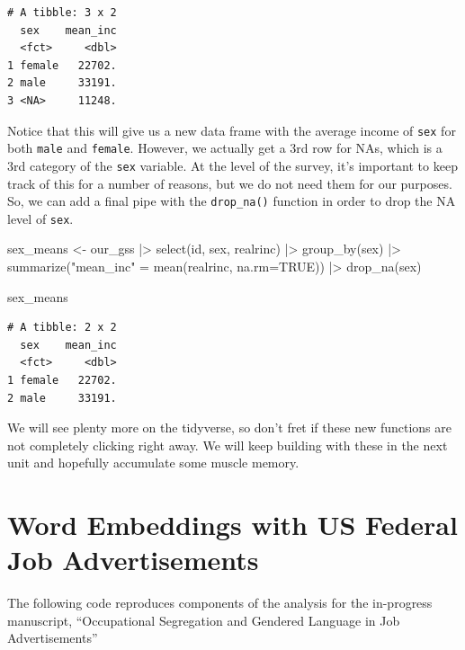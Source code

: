 \documentclass[
  letterpaper,
  DIV=11,
  numbers=noendperiod]{scrreprt}
\newenvironment{Shaded}{\begin{snugshade}}{\end{snugshade}}
\newcommand{\AttributeTok}[1]{\textcolor[rgb]{0.40,0.45,0.13}{#1}}
\newcommand{\ConstantTok}[1]{\textcolor[rgb]{0.56,0.35,0.01}{#1}}
\newcommand{\FunctionTok}[1]{\textcolor[rgb]{0.28,0.35,0.67}{#1}}
\newcommand{\NormalTok}[1]{\textcolor[rgb]{0.00,0.23,0.31}{#1}}
\newcommand{\OtherTok}[1]{\textcolor[rgb]{0.00,0.23,0.31}{#1}}
\newcommand{\SpecialCharTok}[1]{\textcolor[rgb]{0.37,0.37,0.37}{#1}}
\newcommand{\StringTok}[1]{\textcolor[rgb]{0.13,0.47,0.30}{#1}}
\begin{document}
\begin{verbatim}
# A tibble: 3 x 2
  sex    mean_inc
  <fct>     <dbl>
1 female   22702.
2 male     33191.
3 <NA>     11248.
\end{verbatim}

Notice that this will give us a new data frame with the average income
of \texttt{sex} for both \texttt{male} and \texttt{female}. However, we
actually get a 3rd row for NAs, which is a 3rd category of the
\texttt{sex} variable. At the level of the survey, it's important to
keep track of this for a number of reasons, but we do not need them for
our purposes. So, we can add a final pipe with the \texttt{drop\_na()}
function in order to drop the NA level of \texttt{sex}.

\begin{Shaded}
\begin{Highlighting}[]
\NormalTok{sex\_means }\OtherTok{\textless{}{-}}\NormalTok{ our\_gss }\SpecialCharTok{|\textgreater{}}
  \FunctionTok{select}\NormalTok{(id, sex, realrinc) }\SpecialCharTok{|\textgreater{}}
  \FunctionTok{group\_by}\NormalTok{(sex) }\SpecialCharTok{|\textgreater{}}
  \FunctionTok{summarize}\NormalTok{(}\StringTok{"mean\_inc"} \OtherTok{=} \FunctionTok{mean}\NormalTok{(realrinc, }\AttributeTok{na.rm=}\ConstantTok{TRUE}\NormalTok{)) }\SpecialCharTok{|\textgreater{}}
  \FunctionTok{drop\_na}\NormalTok{(sex)}

\NormalTok{sex\_means}
\end{Highlighting}
\end{Shaded}

\begin{verbatim}
# A tibble: 2 x 2
  sex    mean_inc
  <fct>     <dbl>
1 female   22702.
2 male     33191.
\end{verbatim}

We will see plenty more on the tidyverse, so don't fret if these new
functions are not completely clicking right away. We will keep building
with these in the next unit and hopefully accumulate some muscle memory.

\chapter{Word Embeddings with US Federal Job
Advertisements}\label{word-embeddings-with-us-federal-job-advertisements}

The following code reproduces components of the analysis for the
in-progress manuscript, ``Occupational Segregation and Gendered Language
in Job Advertisements''
\end{document}
